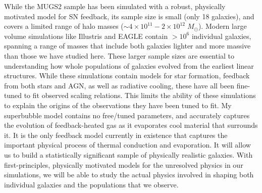 While the MUGS2 sample has been simulated with a robust, physically motivated
model for SN feedback, its sample size is small (only 18 galaxies), and covers a
limited range of halo masses ($\sim 4\times10^{11}-2\times10^{12}\;M_\odot$).
Modern large volume simulations like Illustris \citep{Vogelsberger2014b} and
EAGLE \citep{Schaye2015} contain $>10^6$ individual galaxies, spanning a range
of masses that include both galaxies lighter and more massive than those we have
studied here.  These larger sample sizes are essential to understanding how
whole populations of galaxies evolved from the earliest linear structures.
While these simulations contain models for star formation, feedback from both
stars and AGN, as well as radiative cooling, these have all been fine-tuned to
fit observed scaling relations.  This limits the ability of these simulations to
explain the origins of the observations they have been tuned to fit.  My
superbubble model contains no free/tuned parameters, and accurately captures the
evolution of feedback-heated gas as it evaporates cool material that surrounds
it.  It is the only feedback model currently in existence that captures the
important physical process of thermal conduction and evaporation.  It will allow
us to build a statistically significant sample of physically realistic galaxies.
With first-principles, physically motivated models for the unresolved physics in
our simulations, we will be able to study the actual physics involved in shaping
both individual galaxies and the populations that we observe. 


